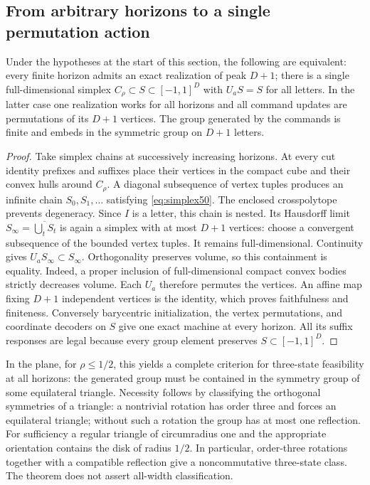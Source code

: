 \subsection{From arbitrary horizons to a single permutation action}
\begin{theorem}\label{thm:allhorizon50}
Under the hypotheses at the start of this section, the following are
equivalent: every finite horizon admits an exact realization of peak
$D+1$; there is a single full-dimensional simplex
$C_\rho\subset S\subset[-1,1]^D$ with $U_aS=S$ for all letters.
In the latter case one realization works for all horizons and all
command updates are permutations of its $D+1$ vertices. The group
generated by the commands is finite and embeds in the symmetric group
on $D+1$ letters.
\end{theorem}
\begin{proof}
Take simplex chains at successively increasing horizons. At every cut
identity prefixes and suffixes place their vertices in the compact
cube and their convex hulls around $C_\rho$. A diagonal subsequence of
vertex tuples produces an infinite chain $S_0,S_1,\ldots$ satisfying
\eqref{eq:simplex50}. The enclosed crosspolytope prevents degeneracy.
Since $I$ is a letter, this chain is nested. Its Hausdorff limit
$S_\infty=\overline{\bigcup_t S_t}$ is again a simplex with at most
$D+1$ vertices: choose a convergent subsequence of the bounded vertex
tuples. It remains full-dimensional. Continuity gives
$U_aS_\infty\subset S_\infty$. Orthogonality preserves volume, so this
containment is equality. Indeed, a proper inclusion of full-dimensional
compact convex bodies strictly decreases volume. Each $U_a$ therefore
permutes the vertices. An affine map fixing $D+1$ independent vertices
is the identity, which proves faithfulness and finiteness.
Conversely barycentric initialization, the vertex permutations, and
coordinate decoders on $S$ give one exact machine at every horizon.
All its suffix responses are legal because every group element
preserves $S\subset[-1,1]^D$.
\end{proof}

In the plane, for $\rho\le1/2$, this yields a complete criterion for
three-state feasibility at all horizons: the generated group must be
contained in the symmetry group of some equilateral triangle. Necessity
follows by classifying the orthogonal symmetries of a triangle: a
nontrivial rotation has order three and forces an equilateral triangle;
without such a rotation the group has at most one reflection. For
sufficiency a regular triangle of circumradius one and the appropriate
orientation contains the disk of radius $1/2$. In particular, order-three
rotations together with a compatible reflection give a noncommutative
three-state class. The theorem does not assert all-width classification.


